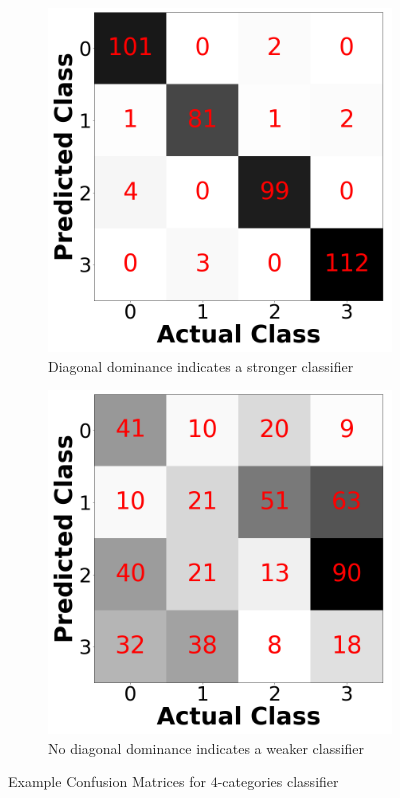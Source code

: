 \documentclass[12pt,letterpaper]{article}
\begin{document}
\begin{figure}[H]

	\begin{subfigure}[b]{0.45\textwidth}
	\centering
	\includegraphics[width=\textwidth]{../FiguresMetrics/StdConfA}
	\caption{Diagonal dominance indicates a stronger classifier}
	\end{subfigure}
	\hfill	\begin{subfigure}[b]{0.45\textwidth}
	\centering
	\includegraphics[width=\textwidth]{../FiguresMetrics/StdConfB}
	\caption{No diagonal dominance indicates a weaker classifier}
	\end{subfigure}
		
\caption{Example Confusion Matrices for $4$-categories classifier}
\label{fig-DummyConfMat}
\end{figure}
\end{document}
